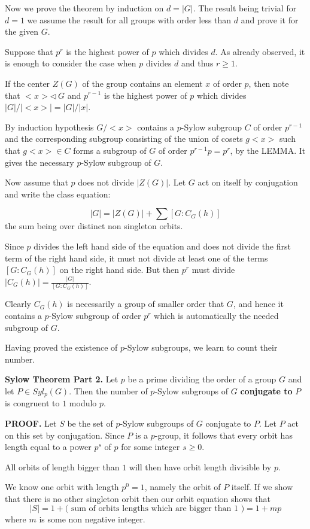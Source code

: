 \documentclass[12pt]{article}
\newcommand{\bigfrac}[2]{\frac{\textstyle #1}{\textstyle #2}}
\begin{document}
Now we prove the theorem by induction on $d=|G|$. The result being
trivial for $d=1$ we assume the result for all groups with order less
than $d$ and prove it for the given $G$.

Suppose that $p^r$ is the highest power of $p$ which divides $d$.
As already observed, it is enough to consider the case when $p$ divides
$d$ and thus $r\geq 1$. 

If the center $Z(G)$ of the group contains an element $x$ of order $p$,
then note that $<x>\triangleleft ~ G$ and $p^{r-1}$ is the highest power
of $p$ which divides $|G|/|<x>| = |G|/|x|$.

By induction hypothesis $G/<x>$ contains a $p$-Sylow subgroup $C$ of order
$p^{r-1}$ and the corresponding subgroup consisting of the union of
cosets $g<x>$ such that $g<x>\in C$ forms a subgroup of $G$ of order
$p^{r-1}p=p^r$, by the LEMMA. It gives the necessary $p$-Sylow subgroup
of $G$.

Now assume that $p$ does not divide $|Z(G)|$. Let $G$ act on itself by
conjugation and write the class equation:

$$|G| = |Z(G)| + \sum [G:C_G(h)]$$
the sum being over distinct non singleton orbits.

Since $p$ divides the left hand side of the equation and does not divide
the first term of the right hand side, it  must not divide at least one of
the terms $[G:C_G(h)]$ on the right
hand side. But then $p^r$ must divide
$|C_G(h)|=\bigfrac{|G|}{[G:C_G(h)]}$.

Clearly $C_G(h)$ is necessarily a group of smaller order that $G$, and hence
it contains a $p$-Sylow subgroup of order $p^r$ which is automatically the
needed subgroup of $G$.

Having proved the existence of $p$-Sylow subgroups, we learn to count
their number.

{\bf Sylow Theorem Part 2.} Let $p$ be a prime dividing the order of a
group $G$ and let $P\in Syl_p(G)$. Then the number of $p$-Sylow
subgroups of $G$ {\bf conjugate to} $P$ is congruent to $1$ modulo $p$.

{\bf PROOF.}
Let $S$ be the set of $p$-Sylow subgroups of $G$ conjugate to $P$.
Let $P$ act on this set by conjugation. Since $P$ is a $p$-group, it
follows that every orbit has length equal to a power $p^s$ of $p$ for
some integer $s\geq 0$.

All orbits of length bigger than $1$ will then have orbit length
divisible by $p$.

We know one orbit with length $p^0=1$, namely the orbit of $P$ itself.
If we show that there is no other singleton orbit then our orbit
equation shows that
$$|S|=1+\mbox{( sum of orbits lengths which are bigger than $1$ )} = 1+mp$$
where $m$ is some non negative integer.
\end{document}
